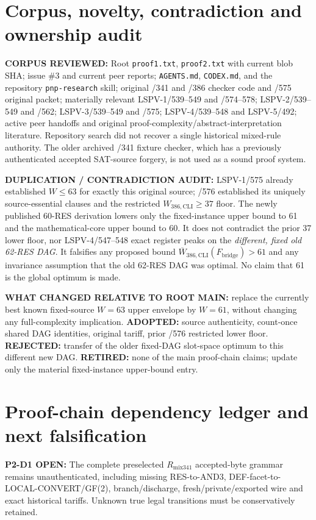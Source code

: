 \documentclass[11pt]{article}
\begin{document}
\section*{Corpus, novelty, contradiction and ownership audit}
\textbf{CORPUS REVIEWED:} Root \texttt{proof1.txt}, \texttt{proof2.txt} with current blob SHA; issue \#3 and current peer reports; \texttt{AGENTS.md}, \texttt{CODEX.md}, and the repository \texttt{pnp-research} skill; original /341 and /386 checker code and /575 original packet; materially relevant LSPV-1/539--549 and /574--578; LSPV-2/539--549 and /562; LSPV-3/539--549 and /575; LSPV-4/539--548 and LSPV-5/492; active peer handoffs and original proof-complexity/abstract-interpretation literature. Repository search did not recover a single historical mixed-rule authority. The older archived /341 fixture checker, which has a previously authenticated accepted SAT-source forgery, is not used as a sound proof system.

\textbf{DUPLICATION / CONTRADICTION AUDIT:} LSPV-1/575 already established $W\leq63$ for exactly this original source; /576 established its uniquely source-essential clauses and the restricted $W_{386,\mathrm{CLI}}\geq37$ floor. The newly published 60-RES derivation lowers only the fixed-instance upper bound to 61 and the mathematical-core upper bound to 60. It does not contradict the prior 37 lower floor, nor LSPV-4/547--548 exact register peaks on the \emph{different, fixed old 62-RES DAG}. It falsifies any proposed bound $\overline W_{386,\mathrm{CLI}}(F_{\mathrm{bridge}})>61$ and any invariance assumption that the old 62-RES DAG was optimal. No claim that 61 is the global optimum is made.

\textbf{WHAT CHANGED RELATIVE TO ROOT MAIN:} replace the currently best known fixed-source $W=63$ upper envelope by $W=61$, without changing any full-complexity implication. \textbf{ADOPTED:} source authenticity, count-once shared DAG identities, original tariff, prior /576 restricted lower floor. \textbf{REJECTED:} transfer of the older fixed-DAG slot-space optimum to this different new DAG. \textbf{RETIRED:} none of the main proof-chain claims; update only the material fixed-instance upper-bound entry.

\section*{Proof-chain dependency ledger and next falsification}
\textbf{P2-D1 OPEN:} The complete preselected $R_{\mathrm{mix341}}$ accepted-byte grammar remains unauthenticated, including missing RES-to-AND3, DEF-facet-to-LOCAL-CONVERT/GF(2), branch/discharge, fresh/private/exported wire and exact historical tariffs. Unknown true legal transitions must be conservatively retained.
\end{document}
